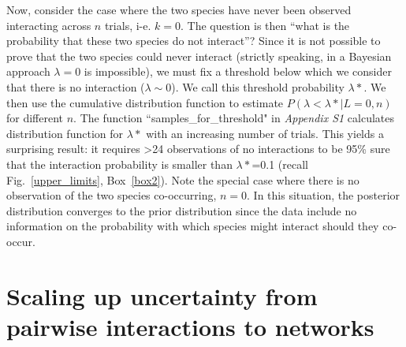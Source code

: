 \documentclass[12pt]{article}
\begin{document}
\begin{spacing}{2.0}
    Now, consider the case where the two species have never been observed interacting across $n$ trials, i-e. $k=0$. The question is then ``what is the probability that these two species do not interact''? Since it is not possible to prove that the two species could never interact (strictly speaking, in a Bayesian approach $\lambda=0$ is impossible), we must fix a threshold below which we consider that there is no interaction ($\lambda \sim 0$). We call this threshold probability $\lambda*$. We then use the cumulative distribution function to estimate $P(\lambda<\lambda*|L=0,n)$ for different $n$. The function ``samples\_for\_threshold" in \emph{Appendix S1} calculates distribution function for $\lambda*$ with an increasing number of trials. This yields a surprising result: it requires \textgreater24 observations of no interactions to be 95\% sure that the interaction probability is smaller than $\lambda*$=0.1 (recall Fig.~\ref{upper_limits}, Box~\ref{box2}). Note the special case where there is no observation of the two species co-occurring, $n = 0$.  In this situation, the posterior distribution converges to the prior distribution since the data include no information on the probability with which species might interact should they co-occur.


\section*{Scaling up uncertainty from pairwise interactions to networks}


\end{spacing}
\end{document}
